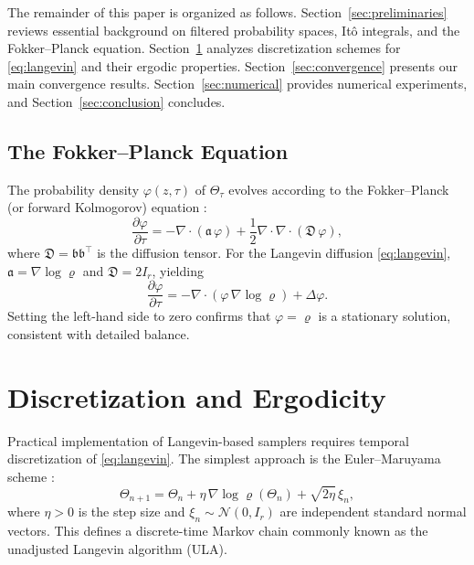 \documentclass[journal]{IEEEtran}
\begin{document}
The remainder of this paper is organized as follows. Section~\ref{sec:preliminaries} reviews essential background on filtered probability spaces, It\^{o} integrals, and the Fokker--Planck equation. Section~\ref{sec:discretization} analyzes discretization schemes for \eqref{eq:langevin} and their ergodic properties. Section~\ref{sec:convergence} presents our main convergence results. Section~\ref{sec:numerical} provides numerical experiments, and Section~\ref{sec:conclusion} concludes.


\subsection{The Fokker--Planck Equation}

The probability density $\varphi(z,\tau)$ of $\Theta_\tau$ evolves according to the Fokker--Planck (or forward Kolmogorov) equation \cite{fokker1914, planck1917}:
\begin{equation}\label{eq:fokker_planck}
  \frac{\partial \varphi}{\partial \tau} = -\nabla \cdot (\mathfrak{a}\, \varphi) + \frac{1}{2}\nabla \cdot \nabla \cdot (\mathfrak{D}\, \varphi),
\end{equation}
where $\mathfrak{D} = \mathfrak{b}\mathfrak{b}^{\!\top}$ is the diffusion tensor. For the Langevin diffusion \eqref{eq:langevin}, $\mathfrak{a} = \nabla \log \varrho$ and $\mathfrak{D} = 2I_r$, yielding
\begin{equation}\label{eq:fp_langevin}
  \frac{\partial \varphi}{\partial \tau} = -\nabla \cdot \left(\varphi\, \nabla \log \varrho\right) + \Delta \varphi.
\end{equation}
Setting the left-hand side to zero confirms that $\varphi = \varrho$ is a stationary solution, consistent with detailed balance.

\section{Discretization and Ergodicity}
\label{sec:discretization}

Practical implementation of Langevin-based samplers requires temporal discretization of \eqref{eq:langevin}. The simplest approach is the Euler--Maruyama scheme \cite{kloeden1992}:
\begin{equation}\label{eq:euler_maruyama}
  \Theta_{n+1} = \Theta_n + \eta\, \nabla \log \varrho(\Theta_n) + \sqrt{2\eta}\, \xi_n,
\end{equation}
where $\eta > 0$ is the step size and $\xi_n \sim \mathcal{N}(0, I_r)$ are independent standard normal vectors. This defines a discrete-time Markov chain commonly known as the unadjusted Langevin algorithm (ULA).
\end{document}

